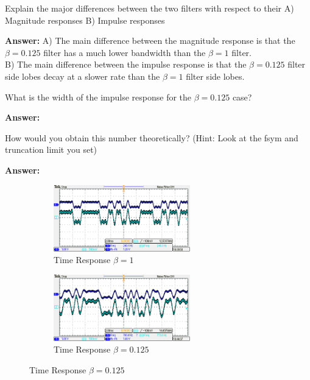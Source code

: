 \documentclass{article}
\begin{document}
\begin{enumerate}
  \begin{item}
  Explain the major differences between the two filters with respect to their
    A) Magnitude responses 
    B) Impulse responses

  \textbf{Answer:}
    A) The main difference between the magnitude response is that the $\beta = 0.125$ filter has
    a much lower bandwidth than the $\beta = 1$ filter.\\

    B) The main difference between the impulse response is that the $\beta = 0.125$ filter
    side lobes decay at a slower rate than the $\beta = 1$ filter side lobes.
  \end{item}

  \begin{item}
    What is the width of the impulse response for the $\beta = 0.125$ case? 

  \textbf{Answer:}
  \end{item}

  \begin{item}
    How would you obtain this number theoretically? (Hint: Look at the fsym and truncation limit you set)

  \textbf{Answer:}
  \end{item}

\end{enumerate}

\begin{figure}[h]
  \begin{center}

    \begin{subfigure}[b]{0.5\linewidth}
			\includegraphics[width=0.65\textwidth]{img/DSK_implementation_beta_1.png}
      \caption{Time Response $\beta = 1$}
    \end{subfigure}

    \begin{subfigure}[b]{0.5\linewidth}
			\includegraphics[width=0.65\textwidth]{img/DSK_implementation_beta_125.png}
      \caption{Time Response $\beta = 0.125$}
    \end{subfigure}

  \end{center}
\end{figure}
\end{document}
